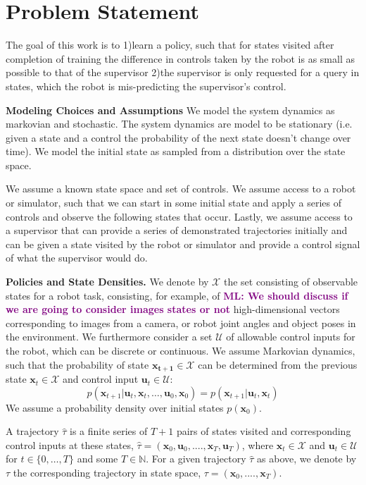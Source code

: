 \documentclass[10pt, conference]{ieeeconf}      %
\newcommand{\bu}{\mathbf{u}}
\newcommand{\bx}{\mathbf{x}}
\newcommand{\mlnote}[1]{\ifthenelse{\boolean{include-notes}}%
 {\textcolor{purple}{\textbf{ML: #1}}}{}}
\begin{document}
\section{Problem Statement}
The goal of this work is to 1)learn a policy, such that for states visited after completion of training the difference in controls taken by the robot is as small as possible to that of the supervisor 2)the supervisor is only requested for a query in states, which the robot is mis-predicting the supervisor's control. 

\noindent\textbf{Modeling Choices and Assumptions} We model the system dynamics as markovian and stochastic. The system dynamics are model to be stationary (i.e. given a state and a control the probability of the next state doesn't change over time). We model the initial state as sampled from a distribution over the state space.

We assume a known state space and set of controls. We assume access to a robot or simulator, such that we can start in some initial state and apply a series of controls and observe the following states that occur.  Lastly, we assume access to a supervisor that can provide a series of demonstrated trajectories initially and can be given a state visited by the robot or simulator and provide a control signal of what the supervisor would do. 

\noindent\textbf{Policies and State Densities.}
We denote by $\mathcal{X}$ the set consisting of observable states for a robot task, consisting, for example, of \mlnote{We should discuss if we are going to consider images states or not}
high-dimensional vectors corresponding to images from a camera, or robot joint angles and object poses in the environment.
We furthermore consider a set $\mathcal{U}$ of allowable control inputs for the robot, which can be discrete or
continuous. We assume Markovian dynamics, such that the probability of state $\mathbf{x_{t+1}}\in
\mathcal{X}$ can be determined from the previous state $\mathbf{x}_t\in\mathcal{X}$ and control input $\mathbf{u}_t\in
\mathcal{U}$: 
$$p(\bx_{t+1}|\bu_{t},\bx_{t}, \ldots, \bu_{0}, \bx_{0})=p(\bx_{t+1}|\bu_{t}, \bx_t)$$
We assume a probability density over initial states $p(\bx_0)$.

A trajectory $\hat{\tau}$ is a finite series of $T+1$ pairs of states visited and corresponding
control inputs at these states, $\hat{\tau} = (\mathbf{x}_0,\mathbf{u}_0, ...., \mathbf{x}_T,\mathbf{u}_T)$, where $\bx_t\in \mathcal{X}$
and $\bu_t\in \mathcal{U}$ for $t\in \{0, \ldots, T\}$ and some $T\in \mathbb{N}$.  
For a given trajectory $\hat{\tau}$ as above, we denote by ${\tau}$ the corresponding trajectory in state space,
${\tau} = (\bx_0,....,\bx_T)$.
\end{document}
